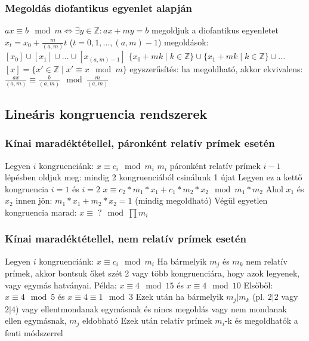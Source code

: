 \documentclass[12pt,a4paper]{article}
\begin{document}
\subsubsection{Megoldás diofantikus egyenlet alapján}

\begin{outline}
	\1 $ax \equiv b \mod m \Leftrightarrow \exists y \in \mathbb{Z}: ax+my=b$
	\1 megoldjuk a diofantikus egyenletet
	\1 $x_t = x_0 + \frac{m}{(a,m)}t$\;\; ($t=0,1,...,(a,m)-1$)
	\1 megoldások: $[x_0] \cup [x_1] \cup ... \cup [x_{(a,m)-1}]$
		\2 $\{x_0 + mk \;|\; k \in \mathbb{Z}\} \cup \{x_1 + mk \;|\; k \in \mathbb{Z}\} \cup ...$
		\2 $[x]=\{x' \in \mathbb{Z} \;|\; x' \equiv x \mod m\}$
	\1 egyszerűsítés: ha megoldható, akkor ekvivalens: $\frac{ax}{(a,m)} \equiv \frac{b}{(a,m)} \mod \frac{m}{(a,m)}$
\end{outline}

\pagebreak

\subsection{Lineáris kongruencia rendszerek}

\subsubsection{Kínai maradéktétellel, páronként relatív prímek esetén}

\begin{outline}
	\1 Legyen $i$ kongruenciánk: $x \equiv c_i \mod m_i$
	\1 $m_i$ páronként relatív prímek
	\1 $i-1$ lépésben oldjuk meg: mindig 2 kongruenciából csinálunk 1 újat
		\2 Legyen ez a kettő kongruencia $i=1$ és $i=2$
		\2 $x \equiv c_2*m_1*x_1 + c_1*m_2*x_2 \mod m_1*m_2$
		\2 Ahol $x_1$ és $x_2$ innen jön: $m_1*x_1+m_2*x_2=1$ (mindig megoldható)
	\2 Végül egyetlen kongruencia marad: $x \equiv \;? \mod \prod m_i$
\end{outline}

\subsubsection{Kínai maradéktétellel, nem relatív prímek esetén}

\begin{outline}
	\1 Legyen $i$ kongruenciánk: $x \equiv c_i \mod m_i$
	\1 Ha bármelyik $m_j$ és $m_k$ nem relatív prímek, akkor bontsuk őket szét 2 vagy több kongruenciára, hogy azok legyenek, vagy egymás hatványai.
		\2 Példa: $x \equiv 4 \mod 15$ és $x \equiv 4 \mod 10$
		\2 Elsőből: $x \equiv 4 \mod 5$ és $x \equiv 4 \equiv 1 \mod 3$
	\1 Ezek után ha bármelyik $m_j | m_k$ (pl. $2|2$ vagy $2|4$)
		\2 vagy ellentmondanak egymásnak és nincs megoldás
		\2 vagy nem mondanak ellen egymásnak, $m_j$ eldobható
	\1 Ezek után relatív prímek $m_i$-k és megoldhatók a fenti módszerrel
\end{outline}
\end{document}
